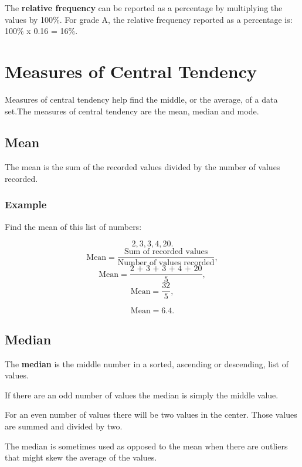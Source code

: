 \documentclass[
]{book}
\begin{document}
The \textbf{relative frequency} can be reported as a percentage by multiplying the values by 100\%. For grade A, the relative frequency reported as a percentage is: 100\% x 0.16 = 16\%.

\hypertarget{measures-of-central-tendency}{%
\section{Measures of Central Tendency}\label{measures-of-central-tendency}}

Measures of central tendency help find the middle, or the average, of a data set.The measures of central tendency are the mean, median and mode.

\hypertarget{mean}{%
\subsection{Mean}\label{mean}}

The mean is the sum of the recorded values divided by the number of values recorded.

\hypertarget{example}{%
\subsubsection{Example}\label{example}}

Find the mean of this list of numbers:

\[ 2, 3, 3, 4, 20.\]
\[ \textrm{Mean} = \frac{\textrm{Sum of recorded values}}{\textrm{Number of values recorded}},\]
\[ \textrm{Mean} = \frac{\textrm{2 + 3 + 3 + 4 + 20}}{\textrm{5}},\]
\[ \textrm{Mean} = \frac{\textrm{32}}{\textrm{5}},\]

\[ \textrm{Mean} = 6.4.\]

\hypertarget{median}{%
\subsection{Median}\label{median}}

The \textbf{median} is the middle number in a sorted, ascending or descending, list of values.

If there are an odd number of values the median is simply the middle value.

For an even number of values there will be two values in the center. Those values are summed and divided by two.

The median is sometimes used as opposed to the mean when there are outliers that might skew the average of the values.
\end{document}
